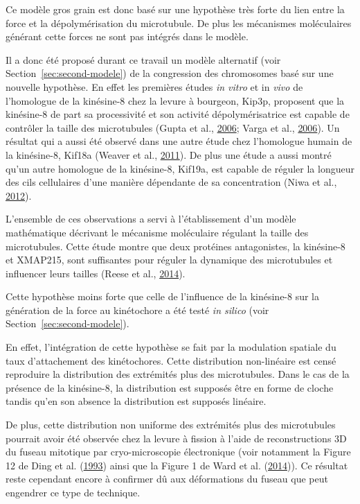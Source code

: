 \documentclass[12pt,a4paper,twoside,openright]{book}
\begin{document}
Ce modèle gros grain est donc basé sur une hypothèse très forte du lien
entre la force et la dépolymérisation du microtubule. De plus les
mécanismes moléculaires générant cette forces ne sont pas intégrés dans
le modèle.

Il a donc été proposé durant ce travail un modèle alternatif (voir
Section~\ref{sec:second-modele}) de la congression des chromosomes basé
sur une nouvelle hypothèse. En effet les premières études \emph{in
vitro} et in \emph{vivo} de l'homologue de la kinésine-8 chez la levure
à bourgeon, Kip3p, proposent que la kinésine-8 de part sa processivité
et son activité dépolymérisatrice est capable de contrôler la taille des
microtubules (Gupta et al., \protect\hyperlink{ref-Gupta2006}{2006};
Varga et al., \protect\hyperlink{ref-Varga2006}{2006}). Un résultat qui
a aussi été observé dans une autre étude chez l'homologue humain de la
kinésine-8, Kif18a (Weaver et al.,
\protect\hyperlink{ref-Weaver2011}{2011}). De plus une étude a aussi
montré qu'un autre homologue de la kinésine-8, Kif19a, est capable de
réguler la longueur des cils cellulaires d'une manière dépendante de sa
concentration (Niwa et al., \protect\hyperlink{ref-Niwa2012}{2012}).

L'ensemble de ces observations a servi à l'établissement d'un modèle
mathématique décrivant le mécanisme moléculaire régulant la taille des
microtubules. Cette étude montre que deux protéines antagonistes, la
kinésine-8 et XMAP215, sont suffisantes pour réguler la dynamique des
microtubules et influencer leurs tailles (Reese et al.,
\protect\hyperlink{ref-Reese2014a}{2014}).

Cette hypothèse moins forte que celle de l'influence de la kinésine-8
sur la génération de la force au kinétochore a été testé \emph{in
silico} (voir Section~\ref{sec:second-modele}).

En effet, l'intégration de cette hypothèse se fait par la modulation
spatiale du taux d'attachement des kinétochores. Cette distribution
non-linéaire est censé reproduire la distribution des extrémités plus
des microtubules. Dans le cas de la présence de la kinésine-8, la
distribution est supposés être en forme de cloche tandis qu'en son
absence la distribution est supposés linéaire.

De plus, cette distribution non uniforme des extrémités plus des
microtubules pourrait avoir été observée chez la levure à fission à
l'aide de reconstructions 3D du fuseau mitotique par cryo-microscopie
électronique (voir notamment la Figure 12 de Ding et al.
(\protect\hyperlink{ref-Ding1993a}{1993}) ainsi que la Figure 1 de Ward
et al. (\protect\hyperlink{ref-Ward2014}{2014})). Ce résultat reste
cependant encore à confirmer dû aux déformations du fuseau que peut
engendrer ce type de technique.
\end{document}
